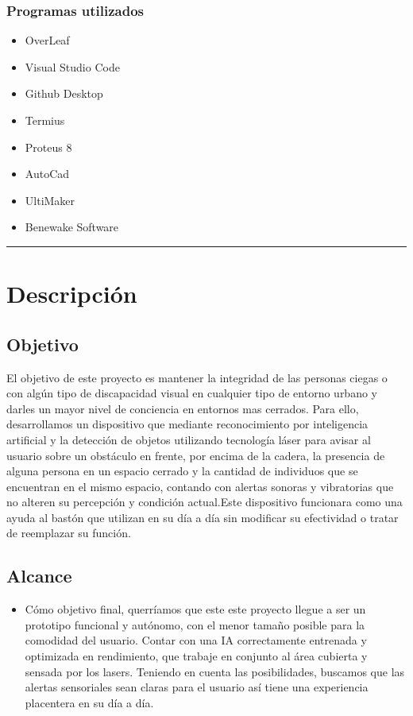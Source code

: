 \documentclass[12pt,a4paper]{article}
\newcommand{\separador}{\vspace{0.5cm}\noindent\rule{\linewidth}{0.5pt}\vspace{0.5cm}}
\begin{document}
\subsubsection*{Programas utilizados}

\begin{itemize}
    \item OverLeaf
    \item Visual Studio Code
    \item Github Desktop
    \item Termius
    \item Proteus 8
    \item AutoCad
    \item UltiMaker
    \item Benewake Software
\end{itemize}

\separador

\section{Descripción}

\subsection{Objetivo}
El objetivo de este proyecto es mantener la integridad de las personas ciegas o con algún tipo de discapacidad visual en cualquier tipo de entorno urbano y darles un mayor nivel de conciencia en entornos mas cerrados. Para ello, desarrollamos un dispositivo que mediante reconocimiento por inteligencia artificial y la detección de objetos utilizando tecnología láser para avisar al usuario sobre un obstáculo en frente, por encima de la cadera, la presencia de alguna persona en un espacio cerrado y la cantidad de individuos que se encuentran en el mismo espacio, contando con alertas sonoras y vibratorias que no alteren su percepción y condición actual.Este dispositivo funcionara como una ayuda al bastón que utilizan en su día a día sin modificar su efectividad o tratar de reemplazar su función.

\subsection{Alcance}
\begin{itemize}

\item Cómo objetivo final, querríamos que este este proyecto llegue a ser un prototipo funcional y autónomo, con el menor tamaño posible para la comodidad del usuario. Contar con una IA correctamente entrenada y optimizada en rendimiento, que trabaje en conjunto al área cubierta y sensada por los lasers. Teniendo en cuenta las posibilidades, buscamos que las alertas sensoriales sean claras para el usuario así tiene una experiencia placentera en su día a día.
\end{itemize}
\end{document}
